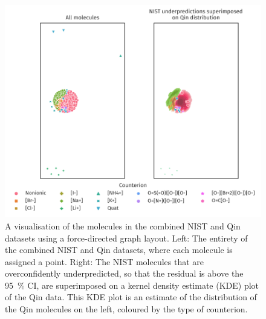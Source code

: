 \begin{figure}
    \includegraphics[width=\textwidth]{images/force-graph.pdf}
    \caption{ A visualisation of the molecules in the combined NIST and Qin
        datasets using a force-directed graph layout. Left: The entirety of the
        combined NIST and Qin datasets, where each molecule is assigned a point.
        Right: The NIST molecules that are overconfidently underpredicted, so
        that the residual is above the \SI{95}{\%} CI, are superimposed on a
        kernel density estimate (KDE) plot of the Qin data. This KDE plot is an
        estimate of the distribution of the Qin molecules on the left, coloured
        by the type of counterion.}
    \label{fig:fdg}
\end{figure}
